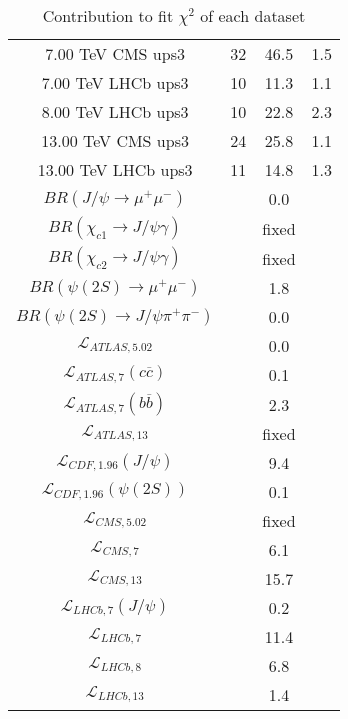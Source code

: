 \begin{table}[h!]
\begin{tabular}{c|c|c|c}
7.00 TeV CMS ups3 & 32 & 46.5 & 1.5 \\
7.00 TeV LHCb ups3 & 10 & 11.3 & 1.1 \\
8.00 TeV LHCb ups3 & 10 & 22.8 & 2.3 \\
13.00 TeV CMS ups3 & 24 & 25.8 & 1.1 \\
13.00 TeV LHCb ups3 & 11 & 14.8 & 1.3 \\
\hline
$BR(J/\psi\rightarrow\mu^+\mu^-)$ &  & 0.0 &  \\
$BR(\chi_{c1}\rightarrow J/\psi\gamma)$ &  & fixed & \\
$BR(\chi_{c2}\rightarrow J/\psi\gamma)$ &  & fixed & \\
$BR(\psi(2S)\rightarrow\mu^+\mu^-)$ &  & 1.8 &  \\
$BR(\psi(2S)\rightarrow J/\psi\pi^+\pi^-)$ &  & 0.0 &  \\
$\mathcal L_{ATLAS,5.02}$ &  & 0.0 &  \\
$\mathcal L_{ATLAS,7}(c\overline c)$ &  & 0.1 &  \\
$\mathcal L_{ATLAS,7}(b\overline b)$ &  & 2.3 &  \\
$\mathcal L_{ATLAS,13}$ &  & fixed & \\
$\mathcal L_{CDF,1.96}(J/\psi)$ &  & 9.4 &  \\
$\mathcal L_{CDF,1.96}(\psi(2S))$ &  & 0.1 &  \\
$\mathcal L_{CMS,5.02}$ &  & fixed & \\
$\mathcal L_{CMS,7}$ &  & 6.1 &  \\
$\mathcal L_{CMS,13}$ &  & 15.7 &  \\
$\mathcal L_{LHCb,7}(J/\psi)$ &  & 0.2 &  \\
$\mathcal L_{LHCb,7}$ &  & 11.4 &  \\
$\mathcal L_{LHCb,8}$ &  & 6.8 &  \\
$\mathcal L_{LHCb,13}$ &  & 1.4 &  \\
\end{tabular}
\caption{Contribution to fit $\chi^2$ of each dataset}
\end{table}
